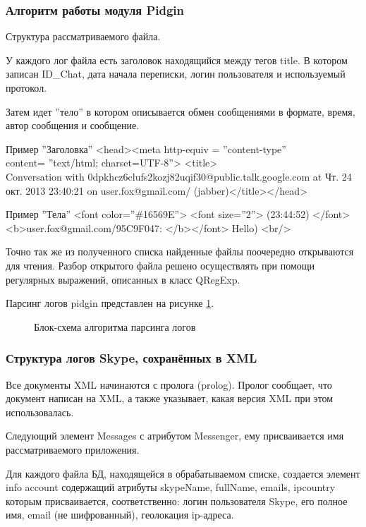 \subsubsection{Алгоритм работы модуля Pidgin}

Структура рассматриваемого файла. 

У каждого лог файла есть заголовок находящийся между тегов title. В котором записан ID\_Chat, дата начала переписки, логин пользователя и используемый протокол.

Затем идет ''тело'' в котором описывается обмен сообщениями в формате, время, автор сообщения и сообщение.

Пример ''Заголовка'' <head><meta http-equiv = ''content-type''\\ content= ''text/html; charset=UTF-8''> <title>\\ Conversation with 0dpkhcz6clufs2kozj82uqif30@public.talk.google.com at Чт. 24 окт. 2013 23:40:21 on user.fox@gmail.com/ (jabber)</title></head>

Пример ''Тела'' <font color=''\#16569E''> <font size=''2''> (23:44:52) </font> <b>user.fox@gmail.com/95C9F047: </b></font> Hello) <br/>

Точно так же из полученного списка найденные файлы поочередно открываются для чтения. Разбор открытого файла решено осуществлять при помощи регулярных выражений, описанных в класс QRegExp.

Парсинг логов pidgin представлен на рисунке \ref{pic:Pars_pidgin_log}.

\begin{figure}[h]
\caption{Блок-схема алгоритма парсинга логов}
\label{pic:Pars_pidgin_log}
\end{figure}

\subsubsection{Структура логов Skype, сохранённых в XML}

Все документы XML начинаются с пролога (prolog). Пролог сообщает, что документ написан на XML, а также указывает, какая версия XML при этом использовалась.  

Следующий элемент Messages с атрибутом Messenger, ему присваивается имя рассматриваемого приложения.

Для каждого файла БД, находящейся в обрабатываемом списке, создается элемент info account содержащий атрибуты skypeName, fullName, emails, ipcountry которым присваивается, соответственно: логин пользователя Skype, его полное имя, email (не шифрованный), геолокация ip-адреса.  

